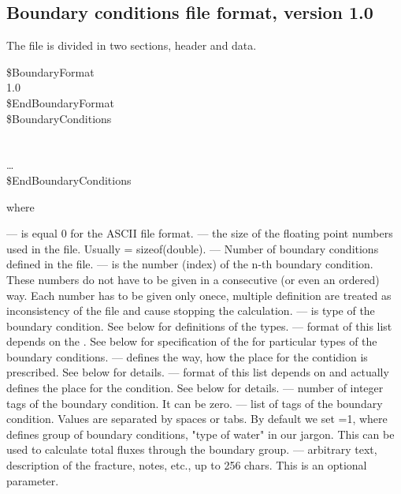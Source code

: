 \subsection{Boundary conditions file format, version 1.0}
\label{boundary_file}

The file is divided in two sections, header and data.
\begin{fileformat}
\$BoundaryFormat\\
  1.0  \\
\$EndBoundaryFormat\\
\$BoundaryConditions\\
  \\
    
   
    \vari{[text]}\\
  \dots\\
\$EndBoundaryConditions\\
\end{fileformat}
where
\begin{description}
  --- is equal 0 for the ASCII file format.
  --- the size of the floating point numbers used in
  the file. Usually  = sizeof(double).
  --- Number of boundary conditions defined in the
  file.
  --- is the number (index) of the n-th boundary
  condition. These numbers do not have to be given in a consecutive (or even an
  ordered) way. Each number has to be given only onece, multiple definition
  are treated as inconsistency of the file and cause stopping the
  calculation.
  --- is type of the boundary condition. See below for
   definitions of the types.
  --- format of this list depends on the
   . See below for specification of the 
   for particular types of the boundary conditions.
  --- defines the way, how the place for the contidion is
   prescribed. See below for details.
  --- format of this list depends on 
   and actually defines the place for the condition. See below for details.
  --- number of integer tags of the boundary
  condition. It can be zero.
  --- list of tags of the
   boundary condition. Values are
   separated by spaces or tabs. By default we set
   =1, where  defines group of boundary
   conditions, "type of water" in our jargon. This can be used to calculate total fluxes through 
   the boundary group.
  --- arbitrary text, description of the fracture, notes,
   etc., up to 256 chars. This is an optional parameter.
\end{description}
